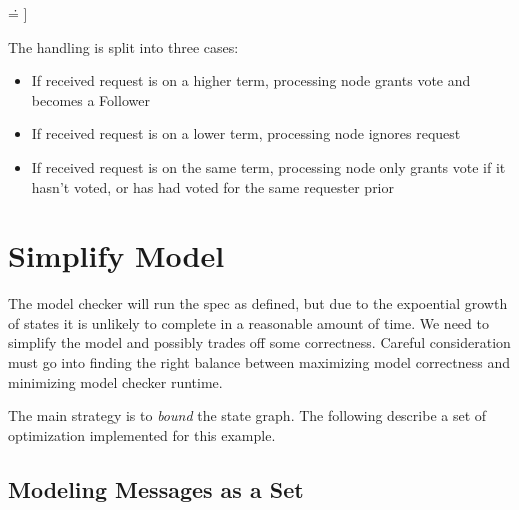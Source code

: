 \documentclass{report}
\begin{document}
\begin{tlatex}
{ \.{=} ]}%
 \@x{\@s{48.01} \.{\land} messages \.{'} \.{=} AddMessage ( [ fSrc \.{\mapsto}
 i ,\,}%
%
%
%
\@x{\@s{180.15} fSuccess \.{\mapsto} 1 ] ,\,}%
%
\end{tlatex}
\newline

The handling is split into three cases: 
\begin{itemize}
    \item If received request is on a higher term, processing node grants vote and becomes a Follower
    \item If received request is on a lower term, processing node ignores request
    \item If received request is on the same term, processing node only grants
    vote if it hasn't voted, or has had voted for the same requester prior 
\end{itemize}

\section{Simplify Model}

The model checker will run the spec as defined, but due to the expoential growth
of states it is unlikely to complete in a reasonable amount of time. We need to
simplify the model and possibly trades off some correctness. Careful
consideration must go into finding the right balance between maximizing model
correctness and minimizing model checker runtime.\newline

The main strategy is to \textit{bound} the state graph. The following describe a
set of optimization implemented for this example.

\subsection{Modeling Messages as a Set}
\end{document}

